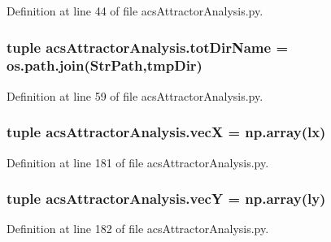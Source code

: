Definition at line 44 of file acs\-Attractor\-Analysis.\-py.

\hypertarget{a00090_ad3caf9c42727aaab24f4ea4dae362fc9}{
\subsubsection[{tot\-Dir\-Name}]{\setlength{\rightskip}{0pt plus 5cm}tuple acs\-Attractor\-Analysis.\-tot\-Dir\-Name = os.\-path.\-join({\bf Str\-Path},tmp\-Dir)}}\label{a00090_ad3caf9c42727aaab24f4ea4dae362fc9}


Definition at line 59 of file acs\-Attractor\-Analysis.\-py.

\hypertarget{a00090_af20e9c92b7d977049b881882c0d1382c}{
\subsubsection[{vec\-X}]{\setlength{\rightskip}{0pt plus 5cm}tuple acs\-Attractor\-Analysis.\-vec\-X = np.\-array(lx)}}\label{a00090_af20e9c92b7d977049b881882c0d1382c}


Definition at line 181 of file acs\-Attractor\-Analysis.\-py.

\hypertarget{a00090_a691fb5bd87af2162b5acaf48ea4c06e7}{
\subsubsection[{vec\-Y}]{\setlength{\rightskip}{0pt plus 5cm}tuple acs\-Attractor\-Analysis.\-vec\-Y = np.\-array(ly)}}\label{a00090_a691fb5bd87af2162b5acaf48ea4c06e7}


Definition at line 182 of file acs\-Attractor\-Analysis.\-py.

